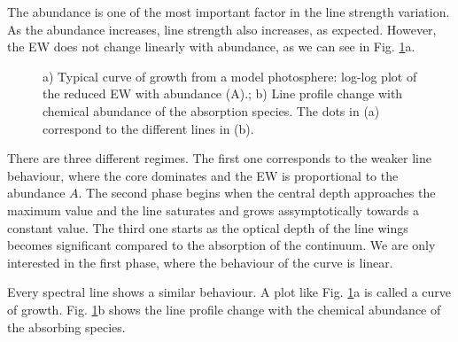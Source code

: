 \documentclass[dvips,12pt,a4paper]{report}
\begin{document}
{The abundance is one of the most important factor in the line strength variation. As the abundance increases, line strength also increases, as expected. However, the EW does not change linearly with abundance, as we can see in Fig. \ref{cog}a. 
\begin{figure}[h]
\centering
{}
\caption[EW and Profile dependence of abundance] {a) Typical curve of growth from a model photosphere: log-log plot of the reduced EW with abundance (A).; b) Line profile change with chemical abundance of the absorption species. The dots in (a) correspond to the different lines in (b).}
\label{cog}
\end{figure}

There are three different regimes. The first one corresponds to the weaker line behaviour, where the core dominates and the EW is proportional to the abundance $A$. The second phase begins when the central depth approaches the maximum value and the line saturates and grows assymptotically towards a constant value. The third one starts as the optical depth of the line wings becomes significant compared to the absorption of the continuum. We are only interested in the first phase, where the behaviour of the curve is linear.

Every spectral line shows a similar behaviour. A plot like Fig. \ref{cog}a is called a curve of growth. Fig. \ref{cog}b shows the line profile change with the chemical abundance of the absorbing species. 

}
\end{document}
